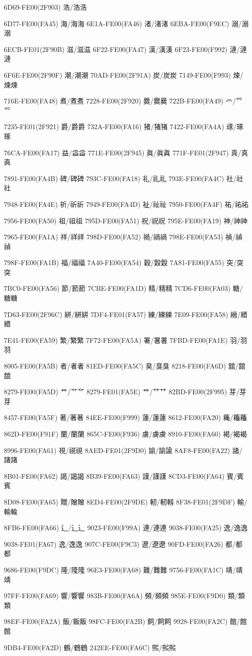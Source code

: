 6D69-FE00(2F903) 浩/浩︀浩\par
6D77-FE00(FA45) 海/海︀海 
6E1A-FE00(FA46) 渚/渚︀渚 
6EBA-FE00(F9EC) 溺/溺︀溺\par
6ECB-FE01(2F90B) 滋/滋︁滋 
6F22-FE00(FA47) 漢/漢︀漢 
6F23-FE00(F992) 漣/漣︀漣\par
6F6E-FE00(2F90F) 潮/潮︀潮 
70AD-FE00(2F91A) 炭/炭︀炭 
7149-FE00(F993) 煉/煉︀煉\par
716E-FE00(FA48) 煮/煮︀煮 
7228-FE00(2F920) 爨/爨︀爨 
722B-FE00(FA49) 爫/爫︀爫\par
7235-FE01(2F921) 爵/爵︁爵 
732A-FE00(FA16) 猪/猪︀猪 
7422-FE00(FA4A) 琢/琢︀琢\par
76CA-FE00(FA17) 益/益︀益 
771E-FE00(2F945) 眞/眞︀眞 
771F-FE01(2F947) 真/真︁真\par
7891-FE00(FA4B) 碑/碑︀碑 
793C-FE00(FA18) 礼/礼︀礼 
793E-FE00(FA4C) 社/社︀社\par
7948-FE00(FA4E) 祈/祈︀祈 
7949-FE00(FA4D) 祉/祉︀祉 
7950-FE00(FA4F) 祐/祐︀祐\par
7956-FE00(FA50) 祖/祖︀祖 
795D-FE00(FA51) 祝/祝︀祝 
795E-FE00(FA19) 神/神︀神\par
7965-FE00(FA1A) 祥/祥︀祥 
798D-FE00(FA52) 禍/禍︀禍 
798E-FE00(FA53) 禎/禎︀禎\par
798F-FE00(FA1B) 福/福︀福 
7A40-FE00(FA54) 穀/穀︀穀 
7A81-FE00(FA55) 突/突︀突\par
7BC0-FE00(FA56) 節/節︀節 
7CBE-FE00(FA1D) 精/精︀精 
7CD6-FE00(FA03) 糖/糖︀糖\par
7D63-FE00(2F96C) 絣/絣︀絣 
7DF4-FE01(FA57) 練/練︁練 
7E09-FE00(FA58) 縉/縉︀縉\par
7E41-FE00(FA59) 繁/繁︀繁 
7F72-FE00(FA5A) 署/署︀署 
7FBD-FE00(FA1E) 羽/羽︀羽\par
8005-FE00(FA5B) 者/者︀者 
81ED-FE00(FA5C) 臭/臭︀臭 
8218-FE00(FA6D) 舘/舘︀舘\par
8279-FE00(FA5D) 艹/艹︀艹 
8279-FE01(FA5E) 艹/艹︁艹 
82BD-FE00(2F995) 芽/芽︀芽\par
8457-FE00(FA5F) 著/著︀著 
84EE-FE00(F999) 蓮/蓮︀蓮 
8612-FE00(FA20) 蘒/蘒︀蘒\par
862D-FE00(F91F) 蘭/蘭︀蘭 
865C-FE00(F936) 虜/虜︀虜 
8910-FE00(FA60) 褐/褐︀褐\par
8996-FE00(FA61) 視/視︀視 
8AED-FE01(2F9D0) 諭/諭︁諭 
8AF8-FE00(FA22) 諸/諸︀諸\par
8B01-FE00(FA62) 謁/謁︀謁 
8B39-FE00(FA63) 謹/謹︀謹 
8CD3-FE00(FA64) 賓/賓︀賓\par
8D08-FE00(FA65) 贈/贈︀贈 
8ED4-FE00(2F9DE) 軔/軔︀軔 
8F38-FE01(2F9DF) 輸/輸︁輸\par
8FB6-FE00(FA66) 辶/辶︀辶 
9023-FE00(F99A) 連/連︀連 
9038-FE00(FA25) 逸/逸︀逸\par
9038-FE01(FA67) 逸/逸︁逸 
907C-FE00(F9C3) 遼/遼︀遼 
90FD-FE00(FA26) 都/都︀都\par
9686-FE00(F9DC) 隆/隆︀隆 
96E3-FE00(FA68) 難/難︀難 
9756-FE00(FA1C) 靖/靖︀靖\par
97FF-FE00(FA69) 響/響︀響 
983B-FE00(FA6A) 頻/頻︀頻 
985E-FE00(F9D0) 類/類︀類\par
98EF-FE00(FA2A) 飯/飯︀飯 
98FC-FE00(FA2B) 飼/飼︀飼 
9928-FE00(FA2C) 館/館︀館\par
9DB4-FE00(FA2D) 鶴/鶴︀鶴 
242EE-FE00(FA6C) 𤋮/𤋮︀𤋮 
